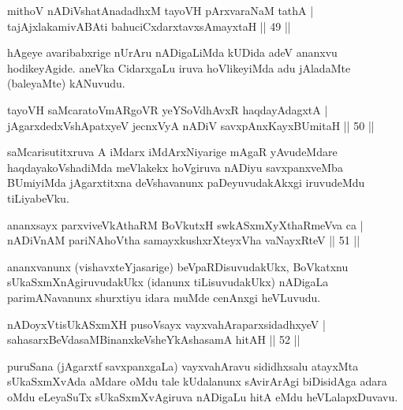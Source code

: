 
\begin{shl}
mithoV nADiVshatAnadadhxM tayoVH pArxvaraNaM tathA |\\
tajAjxlakamivA\s \s BAti bahuciCxdarxtavxsAmayxtaH \hfill || 49 || 
\end{shl}

\begin{artha}
hAgeye avaribabxrige nUrAru nADigaLiMda kUDida adeV ananxvu hodikeyAgide. aneVka CidarxgaLu iruva hoVlikeyiMda adu jAladaMte (baleyaMte) kANuvudu.
\end{artha}


\begin{shl}
tayoVH saMcaratoVmARgoVR yeYSoVdhAvxR haqdayAdagxtA |\\
jAgarxdedxVshApatxyeV jecnxVyA nADiV savxpAnxKayxBUmitaH \hfill || 50 || 
\end{shl}

\begin{artha}
saMcarisutitxruva A iMdarx iMdArxNiyarige mAgaR yAvudeMdare haqdayakoVshadiMda meVlakekx hoVgiruva nADiyu savxpanxveMba BUmiyiMda jAgarxtitxna deVshavanunx paDeyuvudakAkxgi iruvudeMdu tiLiyabeVku.
\end{artha}


\begin{shl}
ananxsayx parxviveVkAthaRM BoVkutxH swkASxmXyXthaRmeVva ca |\\
nADiVnAM pariNAhoV\s tha samayxkushxrXteyxVha vaNayxRteV \hfill || 51 || 
\end{shl}

\begin{artha}
ananxvanunx (vishavxteYjasarige) beVpaRDisuvudakUkx, BoVkatxnu sUkaSxmXnAgiruvudakUkx (idanunx tiLisuvudakUkx) nADigaLa parimANavanunx shurxtiyu idara muMde cenAnxgi heVLuvudu.
\end{artha}

\begin{shl}
nADoyxV\s tisUkASxmXH pusoV\s sayx vayxvahAraparxsidadhxyeV |\\
sahasarxBeVdasaMBinanxkeVsheYkAshasamA hitAH \hfill || 52 || 
\end{shl}

\begin{artha}
puruSana (jAgarxtf savxpanxgaLa) vayxvahAravu sididhxsalu atayxMta sUkaSxmXvAda aMdare oMdu tale kUdalanunx sAvirArAgi biDisidAga adara oMdu eLeyaSuTx sUkaSxmXvAgiruva nADigaLu hitA eMdu heVLalapxDuvavu.
\end{artha}

